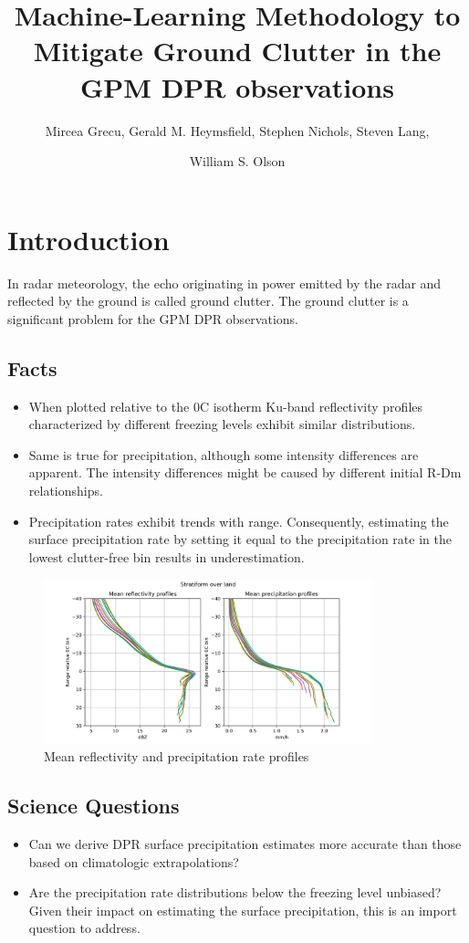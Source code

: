 \documentclass{article}
\title{Machine-Learning Methodology to Mitigate Ground Clutter in the 
GPM DPR observations}
\author{Mircea Grecu, Gerald M. Heymsfield, Stephen Nichols, Steven Lang, \and William S. Olson}
\begin{document}
\maketitle
\section*{Introduction}
In radar meteorology, the echo originating in power emitted by the radar
and reflected by the ground is called ground clutter. The ground 
clutter is a significant problem for the GPM DPR observations. 

\subsection*{Facts}
\begin{itemize}
    \item
      When plotted relative to the 0C isotherm Ku-band reflectivity profiles
      characterized by different freezing levels exhibit similar
      distributions.
    \item
      Same is true for precipitation, although some intensity differences
      are apparent. The intensity differences might be caused by different
      initial R-Dm relationships.
    \item
      Precipitation rates exhibit trends with range. Consequently,
      estimating the surface precipitation rate by setting it equal to the
      precipitation rate in the lowest clutter-free bin results in
      underestimation.
    
    \end{itemize}
    \begin{figure}[h]
        \centering
        \includegraphics[width=0.85\textwidth]{reflectivityProfiles.png}
        \caption{Mean reflectivity and precipitation rate profiles}
        \label{fig:fig1}
    \end{figure}
\subsection*{Science Questions}   
    \begin{itemize}
    \item
      Can we derive DPR surface precipitation estimates more accurate than
      those based on climatologic extrapolations?
    \item
      Are the precipitation rate distributions below the freezing level
      unbiased? Given their impact on estimating the surface precipitation,
      this is an import question to address.
    \end{itemize}
    
\end{document}
